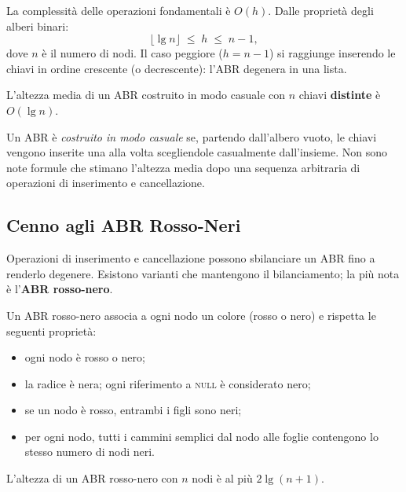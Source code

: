 La complessità delle operazioni fondamentali è $O(h)$. Dalle proprietà degli alberi
binari:
\[
\lfloor \lg n \rfloor \;\leq\; h \;\leq\; n - 1,
\]
dove $n$ è il numero di nodi. Il caso peggiore ($h = n-1$) si raggiunge inserendo le
chiavi in ordine crescente (o decrescente): l'ABR degenera in una lista.

\begin{teorema}
	\label{teo:abr_casuale}
	L'altezza media di un ABR costruito in modo casuale con $n$ chiavi \textbf{distinte}
	è $O(\lg n)$.
\end{teorema}

\begin{nota}
	Un ABR è \emph{costruito in modo casuale} se, partendo dall'albero vuoto, le chiavi
	vengono inserite una alla volta scegliendole casualmente dall'insieme.
	Non sono note formule che stimano l'altezza media dopo una sequenza arbitraria di
	operazioni di inserimento e cancellazione.
\end{nota}

\subsection{Cenno agli ABR Rosso-Neri}
\label{sub:abr_rn}

\begin{softnote}
	Operazioni di inserimento e cancellazione possono sbilanciare un ABR fino a renderlo
	degenere. Esistono varianti che mantengono il bilanciamento; la più nota è
	l'\textbf{ABR rosso-nero}.
\end{softnote}

Un ABR rosso-nero associa a ogni nodo un colore (rosso o nero) e rispetta le seguenti
proprietà:
\begin{itemize}
	\item ogni nodo è rosso o nero;
	\item la radice è nera; ogni riferimento a \textsc{null} è considerato nero;
	\item se un nodo è rosso, entrambi i figli sono neri;
	\item per ogni nodo, tutti i cammini semplici dal nodo alle foglie contengono lo
	stesso numero di nodi neri.
\end{itemize}

\begin{teorema}
	L'altezza di un ABR rosso-nero con $n$ nodi è al più $2\lg(n+1)$.
\end{teorema}

